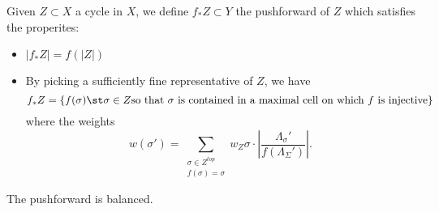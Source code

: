 

    Given $Z\subset X$ a cycle in $X$, we define $f_*Z\subset Y$ the pushforward of $Z$ which satisfies the properites:
    \begin{itemize}
        \item $|f_*Z|=f(|Z|)$
        \item By picking a sufficiently fine representative of $Z$, we have 
        \[f_*Z = \{f(\sigma) \st \sigma\in Z \text{so that $\sigma$ is contained in a maximal cell on which $f$ is injective}\}\]
        where the weights \[w(\sigma')=\sum_{\substack{\sigma\in Z^{top}\\ f(\sigma)=\sigma}} w_Z\sigma \cdot \left|\frac{\Lambda_\sigma'}{f(\Lambda_\Sigma')}\right|.\]
    \end{itemize}
    The pushforward is balanced.

